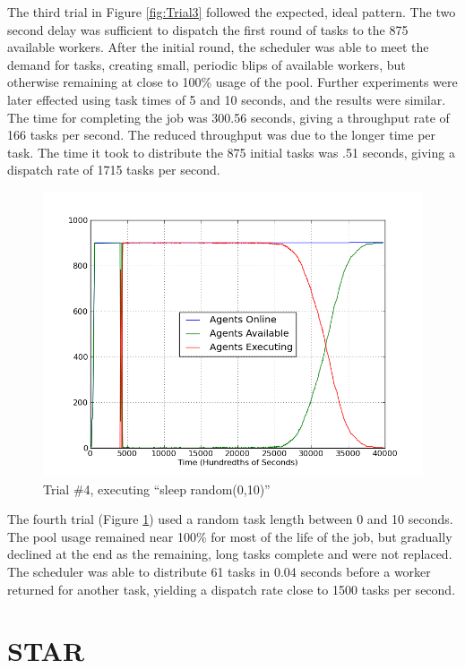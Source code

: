 The third trial in Figure \ref{fig:Trial3} followed the expected,
ideal pattern. The two second delay was sufficient to dispatch the
first round of tasks to the 875 available workers. After the initial
round, the scheduler was able to meet the demand for tasks, creating
small, periodic blips of available workers, but otherwise remaining
at close to 100\% usage of the pool. Further experiments were later
effected using task times of 5 and 10 seconds, and the results were
similar. The time for completing the job was 300.56 seconds, giving
a throughput rate of 166 tasks per second. The reduced throughput
was due to the longer time per task. The time it took to distribute
the 875 initial tasks was .51 seconds, giving a dispatch rate of 1715
tasks per second.

\begin{figure}
\includegraphics[width=\columnwidth]{figures/sleeprandom}
\caption{\label{fig:Trial4}Trial \#4, executing ``sleep random(0,10)''}
\end{figure}


The fourth trial (Figure \ref{fig:Trial4}) used a random task length
between 0 and 10 seconds. The pool usage remained near 100\% for most
of the life of the job, but gradually declined at the end as the remaining,
long tasks complete and were not replaced. The scheduler was able
to distribute 61 tasks in 0.04 seconds before a worker returned for
another task, yielding a dispatch rate close to 1500 tasks per second.


\section{STAR}

